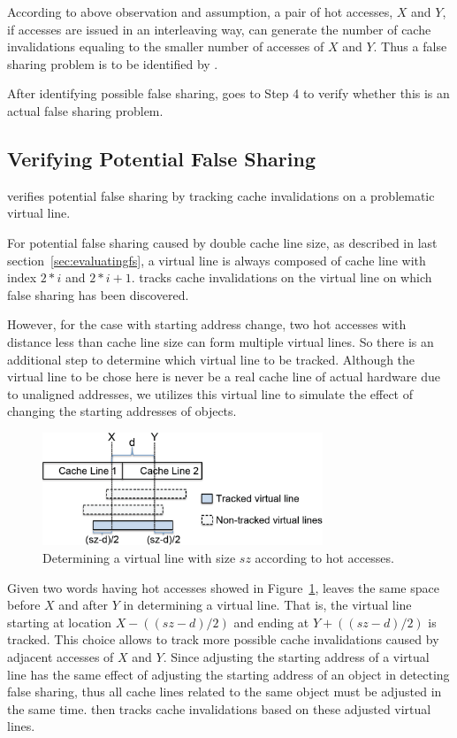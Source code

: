 According to above observation and assumption, 
a pair of hot accesses, $X$ and $Y$, if accesses are issued in an interleaving 
way, can generate the number of cache invalidations equaling to 
the smaller number of accesses of $X$ and $Y$.
Thus a false sharing problem is to be identified by \Predator{}.
  
After identifying possible false sharing, \Predator{} goes to Step 4 to 
verify whether this is an actual false sharing problem.

\subsection{Verifying Potential False Sharing}
\label{sec:tracking}

\Predator{} verifies potential false sharing by tracking 
cache invalidations on a problematic virtual line.

For potential false sharing caused by double cache line size, as described in
last section~\ref{sec:evaluatingfs}, a virtual line is always composed of 
cache line with index $2*i$ and $2*i+1$. 
\Predator{} tracks cache invalidations
on the virtual line on which false sharing has been discovered.

However, for the case with starting address change, 
two hot accesses with distance less than cache line size 
can form multiple virtual lines. 
So there is an additional step to determine which virtual line to be tracked.
Although the virtual line to be chose here is never be a real cache line of actual hardware
due to unaligned addresses,
we utilizes this virtual line to simulate the effect of changing the 
starting addresses of objects.


\begin{figure}
\begin{center} 
\includegraphics[width=3.3in]{fig/trackpotential}
\end{center}
\caption{Determining a virtual line with size $sz$ according to hot accesses.}
\label{fig:trackpotential}
\end{figure}

Given two words having hot accesses showed in Figure~\ref{fig:trackpotential}, 
\Predator{} leaves the same space before $X$ and after $Y$ in determining a virtual line. 
That is, the virtual line starting 
at location $X-((sz-d)/2)$ and ending at $Y+((sz-d)/2)$ is tracked. 
This choice allows to track more possible cache invalidations caused by
adjacent accesses of $X$ and $Y$. 
Since adjusting the starting address of a virtual line has the same effect of
adjusting the starting address of an object in detecting false sharing, thus
all cache lines related to the same object must be adjusted in the same time.
\Predator{} then tracks cache invalidations based on these adjusted virtual lines.

